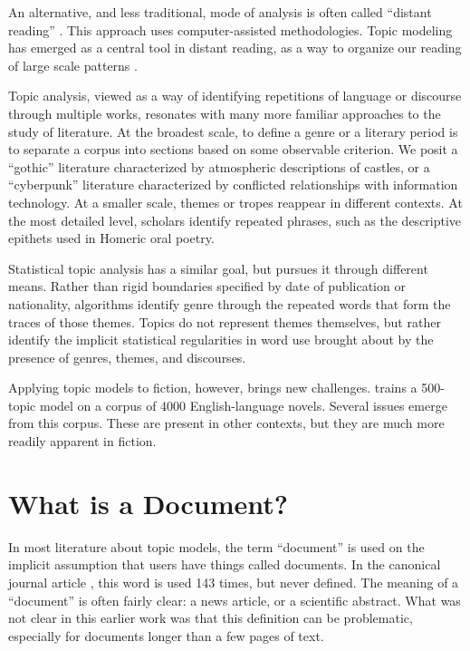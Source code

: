 An alternative, and less traditional, mode of analysis is often called ``distant reading'' \citep{moretti-13}.   This approach uses computer-assisted methodologies. Topic modeling has emerged as a central tool in distant reading, as a way to organize our reading of large scale patterns \citep{blei2012topic}.

Topic analysis, viewed as a way of identifying repetitions of language or discourse through multiple works, resonates with many more familiar approaches to the study of literature.
At the broadest scale, to define a genre or a literary period is to separate a corpus into sections based on some observable criterion.
We posit a ``gothic'' literature characterized by atmospheric descriptions of castles, or a ``cyberpunk'' literature characterized by conflicted relationships with information technology.
At a smaller scale, themes or tropes reappear in different contexts.
At the most detailed level, scholars identify repeated phrases, such as the descriptive epithets used in Homeric oral poetry.

Statistical topic analysis has a similar goal, but pursues it through different means.
Rather than rigid boundaries specified by date of publication or nationality, algorithms identify genre through the repeated words that form the traces of those themes.
Topics do not represent themes themselves, but rather identify the implicit statistical regularities in word use brought about by the presence of genres, themes, and discourses.

Applying topic models to fiction, however, brings new challenges.  \citet{jockers-13} trains a 500-topic model on a corpus of 4000 English-language novels.
Several issues emerge from this corpus. These are present in other contexts, but they are much more readily apparent in fiction.

\section{What is a Document?}

In most literature about topic models, the term ``document'' is used on the implicit assumption that users have things called documents.
In the canonical  journal article \citep{blei-03}, this word is used 143 times, but never defined.
The meaning of a ``document'' is often fairly clear: a news article, or a scientific abstract.
What was not clear in this earlier work was that this definition can be problematic, especially for documents longer than a few pages of text.

